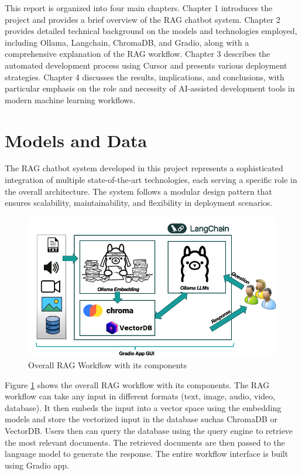 \documentclass[12pt,letterpaper]{article}
\begin{document}
This report is organized into four main chapters. 
Chapter 1 introduces the project and provides a brief overview of the RAG chatbot system. 
Chapter 2 provides detailed technical background on the models and technologies employed, including Ollama, Langchain, ChromaDB, and Gradio, along with a comprehensive explanation of the RAG workflow. 
Chapter 3 describes the automated development process using Cursor and presents various deployment strategies. 
Chapter 4 discusses the results, implications, and conclusions, with particular emphasis on the role and necessity of AI-assisted development tools in modern machine learning workflows.

\newpage

\section{Models and Data}

The RAG chatbot system developed in this project represents a sophisticated integration of multiple state-of-the-art technologies, each serving a specific role in the overall architecture. The system follows a modular design pattern that ensures scalability, maintainability, and flexibility in deployment scenarios.

\begin{figure}[H]
    \centering
    \includegraphics[width=1\textwidth]{plots/Fig1.png}
    \caption{Overall RAG Workflow with its components}
    \label{fig:overall_workflow}
\end{figure}

Figure \ref{fig:overall_workflow} shows the overall RAG workflow with its components. The RAG workflow can take any input in different formats (text, image, audio, video, database).
It then embeds the input into a vector space using the embedding models and store the vectorized input in the database suchas ChromaDB or VectorDB.
Users then can query the database using the query engine to retrieve the most relevant documents.
The retrieved documents are then passed to the language model to generate the response. The entire workflow interface is built using Gradio app.
\end{document}
